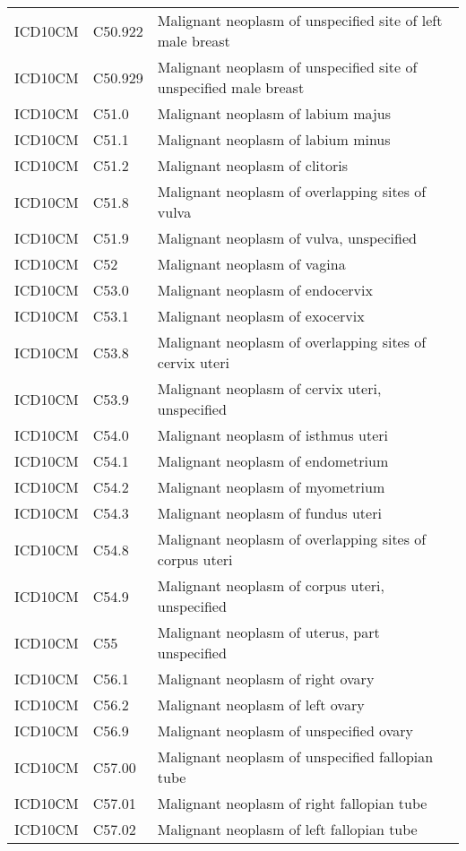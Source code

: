 \begin{longtable}{p{}p{}p{}}
  ICD10CM & C50.922 & Malignant neoplasm of unspecified site of left male breast \\ 
  ICD10CM & C50.929 & Malignant neoplasm of unspecified site of unspecified male breast \\ 
  ICD10CM & C51.0 & Malignant neoplasm of labium majus \\ 
  ICD10CM & C51.1 & Malignant neoplasm of labium minus \\ 
  ICD10CM & C51.2 & Malignant neoplasm of clitoris \\ 
  ICD10CM & C51.8 & Malignant neoplasm of overlapping sites of vulva \\ 
  ICD10CM & C51.9 & Malignant neoplasm of vulva, unspecified \\ 
  ICD10CM & C52 & Malignant neoplasm of vagina \\ 
  ICD10CM & C53.0 & Malignant neoplasm of endocervix \\ 
  ICD10CM & C53.1 & Malignant neoplasm of exocervix \\ 
  ICD10CM & C53.8 & Malignant neoplasm of overlapping sites of cervix uteri \\ 
  ICD10CM & C53.9 & Malignant neoplasm of cervix uteri, unspecified \\ 
  ICD10CM & C54.0 & Malignant neoplasm of isthmus uteri \\ 
  ICD10CM & C54.1 & Malignant neoplasm of endometrium \\ 
  ICD10CM & C54.2 & Malignant neoplasm of myometrium \\ 
  ICD10CM & C54.3 & Malignant neoplasm of fundus uteri \\ 
  ICD10CM & C54.8 & Malignant neoplasm of overlapping sites of corpus uteri \\ 
  ICD10CM & C54.9 & Malignant neoplasm of corpus uteri, unspecified \\ 
  ICD10CM & C55 & Malignant neoplasm of uterus, part unspecified \\ 
  ICD10CM & C56.1 & Malignant neoplasm of right ovary \\ 
  ICD10CM & C56.2 & Malignant neoplasm of left ovary \\ 
  ICD10CM & C56.9 & Malignant neoplasm of unspecified ovary \\ 
  ICD10CM & C57.00 & Malignant neoplasm of unspecified fallopian tube \\ 
  ICD10CM & C57.01 & Malignant neoplasm of right fallopian tube \\ 
  ICD10CM & C57.02 & Malignant neoplasm of left fallopian tube \\ 

\end{longtable}
